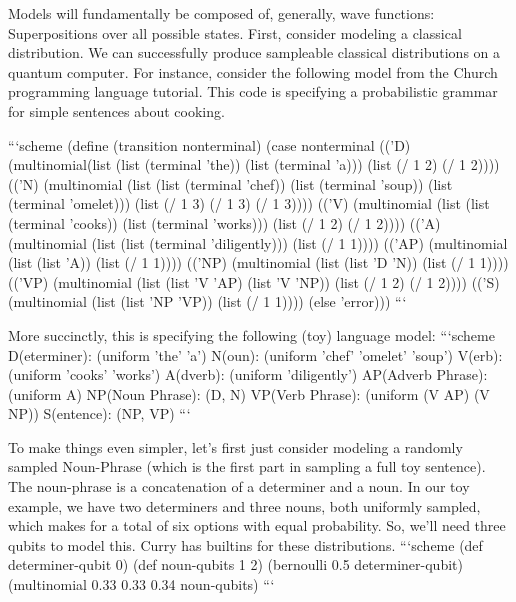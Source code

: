 \documentclass[journal]{IEEEtran}
\begin{document}
 Models will fundamentally be composed of, generally, wave functions: Superpositions over all possible states.
 First, consider modeling a classical distribution. 
 We can successfully produce sampleable classical distributions on a quantum computer.
 For instance, consider the following model from the Church programming language tutorial.
 This code is specifying a probabilistic grammar for simple sentences about cooking.
 
 ```scheme
 (define (transition nonterminal)
   (case nonterminal
         (('D) (multinomial(list (list (terminal 'the))
                                 (list (terminal 'a)))
                           (list (/ 1 2) (/ 1 2))))
         (('N) (multinomial (list (list (terminal 'chef))
                                  (list (terminal 'soup))
                                  (list (terminal 'omelet)))
                            (list (/ 1 3) (/ 1 3) (/ 1 3))))
         (('V) (multinomial (list (list (terminal 'cooks))
                                  (list (terminal 'works)))
                            (list (/ 1 2) (/ 1 2))))
         (('A) (multinomial (list (list (terminal 'diligently)))
                            (list (/ 1 1))))
         (('AP) (multinomial (list (list 'A))
                             (list (/ 1 1))))
         (('NP) (multinomial (list (list 'D 'N))
                             (list (/ 1 1))))
         (('VP) (multinomial (list (list 'V 'AP)
                                   (list 'V 'NP))
                             (list (/ 1 2) (/ 1 2))))
         (('S) (multinomial (list (list 'NP 'VP))
                            (list (/ 1 1))))
         (else 'error)))
 ```
 
 More succinctly, this is specifying the following (toy) language model:
 ```scheme
 D(eterminer):      (uniform 'the' 'a')
 N(oun):            (uniform 'chef' 'omelet' 'soup')
 V(erb):            (uniform 'cooks' 'works')
 A(dverb):          (uniform 'diligently')
 AP(Adverb Phrase): (uniform A)
 NP(Noun Phrase):   (D, N)
 VP(Verb Phrase):   (uniform (V AP) (V NP))
 S(entence):        (NP, VP)
 ```
 
 To make things even simpler, let's first just consider modeling a randomly sampled Noun-Phrase (which is the first part in sampling a full toy sentence).
 The noun-phrase is a concatenation of a determiner and a noun. In our toy example, we have two determiners and three nouns, both uniformly sampled, which makes for a total of six options with equal probability.
 So, we'll need three qubits to model this. Curry has builtins for these distributions.
 ```scheme
 (def determiner-qubit 0)
 (def noun-qubits 1 2)
 (bernoulli 0.5 determiner-qubit)
 (multinomial 0.33 0.33 0.34 noun-qubits)
 ```
 
\end{document}
